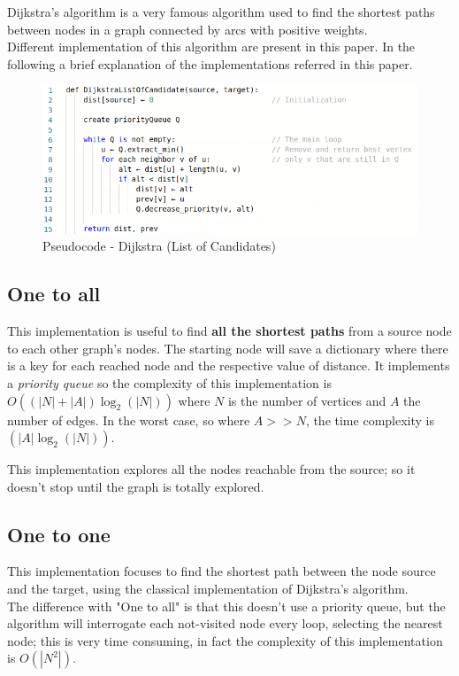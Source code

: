 \documentclass[a4paper,11pt]{report}
\begin{document}
Dijkstra's algorithm is a very famous algorithm used to find the shortest paths between nodes in a graph connected by arcs with positive weights.\\
Different implementation of this algorithm are present in this paper. In the following a brief explanation of the implementations referred in this paper.

\begin{figure}[h]
	\centering
	\includegraphics[width=\linewidth]{img/dijkstraLoC.png}
	\caption{Pseudocode - Dijkstra (List of Candidates)}
	\label{fig:dijkstraLoC}
\end{figure}

\subsection{One to all}
This implementation is useful to find \textbf{all the shortest paths} from a source node to each other graph's nodes. The starting node will save a dictionary where there is a key for each reached node and the respective value of distance.
It implements a \textit{priority queue} so the complexity of this implementation is $O((|N|+|A|)\log_2(|N|))$ where $N$ is the number of vertices and $A$ the number of edges. In the worst case, so where $A>>N$, the time complexity is $(|A|\log_2(|N|))$.

This implementation explores all the nodes reachable from the source; so it doesn't stop until the graph is totally explored.

\subsection{One to one}
This implementation focuses to find the shortest path between the node source and the target, using the classical implementation of Dijkstra's algorithm.\\
The difference with "One to all" is that this doesn't use a priority queue, but the algorithm will interrogate each not-visited node every loop, selecting the nearest node; this is very time consuming, in fact the complexity of this implementation is $O(|N^2|)$.
\end{document}
